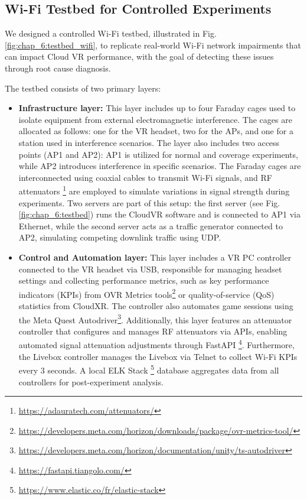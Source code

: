 \subsection{Wi-Fi Testbed for Controlled Experiments}

We designed a controlled Wi-Fi testbed, illustrated in Fig. \ref{fig:chap_6:testbed_wifi}, to replicate real-world Wi-Fi network impairments that can impact Cloud VR performance, with the goal of detecting these issues through root cause diagnosis.

The testbed consists of two primary layers:
\begin{itemize}
    \item \textbf{Infrastructure layer:} This layer includes up to four Faraday cages used to isolate equipment from external electromagnetic interference. The cages are allocated as follows: one for the VR headset, two for the APs, and one for a station used in interference scenarios. The layer also includes two access points (AP1 and AP2): AP1 is utilized for normal and coverage experiments, while AP2 introduces interference in specific scenarios. The Faraday cages are interconnected using coaxial cables to transmit Wi-Fi signals, and \ac{RF} attenuators \footnote{\url{https://adauratech.com/attenuators/}} are employed to simulate variations in signal strength during experiments. Two servers are part of this setup: the first server (see Fig. \ref{fig:chap_6:testbed}) runs the CloudVR software and is connected to AP1 via Ethernet, while the second server acts as a traffic generator connected to AP2, simulating competing downlink traffic using UDP.

    \item \textbf{Control and Automation layer:} This layer includes a VR PC controller connected to the VR headset via USB, responsible for managing headset settings and collecting performance metrics, such as key performance indicators (KPIs) from OVR Metrics tools\footnote{\url{https://developers.meta.com/horizon/downloads/package/ovr-metrics-tool/}} or quality-of-service (QoS) statistics from CloudXR. The controller also automates game sessions using the Meta Quest Autodriver\footnote{\url{https://developers.meta.com/horizon/documentation/unity/ts-autodriver}}. Additionally, this layer features an attenuator controller that configures and manages RF attenuators via APIs, enabling automated signal attenuation adjustments through FastAPI \footnote{\url{https://fastapi.tiangolo.com/}}. Furthermore, the Livebox controller manages the Livebox via Telnet to collect Wi-Fi KPIs every 3 seconds. A local ELK Stack \footnote{\url{https://www.elastic.co/fr/elastic-stack}} database aggregates data from all controllers for post-experiment analysis.

\end{itemize}

